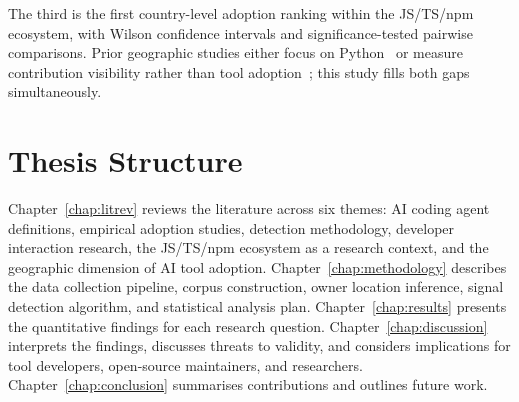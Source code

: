The third is the first country-level adoption ranking within the JS/TS/npm ecosystem, with Wilson confidence intervals and significance-tested pairwise comparisons. Prior geographic studies either focus on Python~\cite{daniotti2025} or measure contribution visibility rather than tool adoption~\cite{wachs2022}; this study fills both gaps simultaneously.

\section{Thesis Structure}
\label{sec:intro:structure}

Chapter~\ref{chap:litrev} reviews the literature across six themes: AI coding agent definitions, empirical adoption studies, detection methodology, developer interaction research, the JS/TS/npm ecosystem as a research context, and the geographic dimension of AI tool adoption. Chapter~\ref{chap:methodology} describes the data collection pipeline, corpus construction, owner location inference, signal detection algorithm, and statistical analysis plan. Chapter~\ref{chap:results} presents the quantitative findings for each research question. Chapter~\ref{chap:discussion} interprets the findings, discusses threats to validity, and considers implications for tool developers, open-source maintainers, and researchers. Chapter~\ref{chap:conclusion} summarises contributions and outlines future work.

